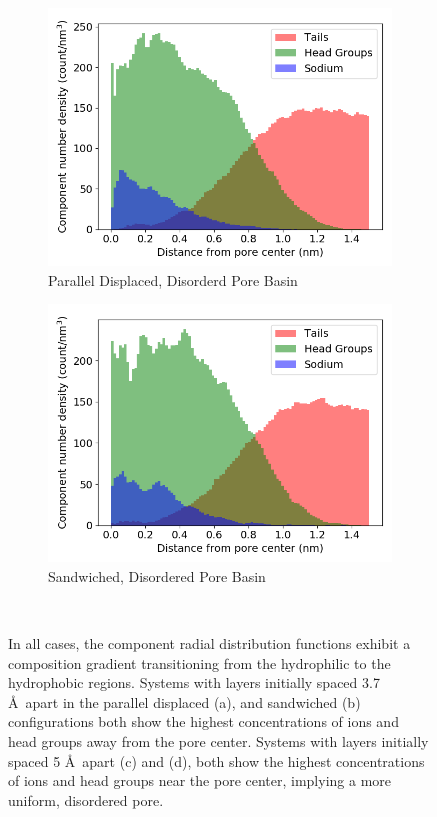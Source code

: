 \documentclass{article}
\begin{document}
\begin{figure}
\begin{subfigure}{0.47\textwidth}
        \includegraphics[width=1\linewidth]{disordered_offset_density.png}
        \caption{Parallel Displaced, Disorderd Pore Basin}
        \label{fig:disordered_offset_density}
  \end{subfigure}
  \begin{subfigure}{0.47\textwidth}
        \includegraphics[width=1\linewidth]{disordered_density.png}
        \caption{Sandwiched, Disordered Pore Basin}
        \label{fig:disorder_layered_density}
  \end{subfigure}
  \caption{In all cases, the component radial distribution functions exhibit a
	  composition gradient transitioning from the hydrophilic to the hydrophobic
	  regions. Systems with layers initially spaced 3.7 \AA~apart in the  parallel
	  displaced (a), and sandwiched (b) configurations both show the highest
	  concentrations of ions and head groups away from the pore center. Systems with
	  layers initially spaced 5 \AA~apart (c) and (d), both show the highest
	  concentrations of ions and head groups near the pore center, implying a more
	  uniform, disordered pore.}~\label{fig:densities}
  \end{figure}
\end{document}
